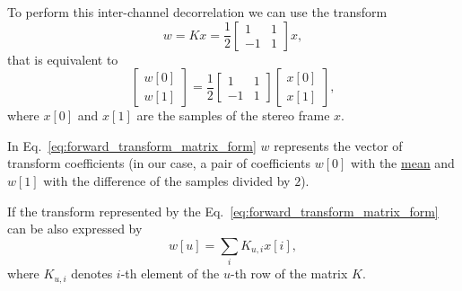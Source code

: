To perform this inter-channel decorrelation we can use the transform
\begin{equation}
  w = Kx = \frac{1}{2}\begin{bmatrix} 1 & 1 \\ -1 & 1 \end{bmatrix}x,
  \label{eq:forward_transform_matrix_form}
\end{equation}
that is equivalent to
\begin{equation*}
  \begin{bmatrix}
    w[0] \\
    w[1]
  \end{bmatrix}
  = \frac{1}{2}
  \begin{bmatrix} 1 & 1 \\ -1 & 1 \end{bmatrix}
  \begin{bmatrix}
    x[0] \\
    x[1]
  \end{bmatrix},
\end{equation*}
where $x[0]$ and $x[1]$ are the samples of the stereo frame $x$.

In Eq.~\ref{eq:forward_transform_matrix_form} $w$ represents the
vector of transform coefficients (in our case, a pair of coefficients
$w[0]$ with the
\href{https://en.wikipedia.org/wiki/Arithmetic_mean}{mean} and $w[1]$
with the difference of the samples divided by $2$).

If the transform represented by the Eq.~\ref{eq:forward_transform_matrix_form} can be
also expressed by
\begin{equation}
  w[u] = \sum_i K_{u,i}x[i],
  \label{eq:forward_transform_linear_combination_form}
\end{equation}
where $K_{u,i}$ denotes $i$-th element of the $u$-th row of the matrix
$K$.

